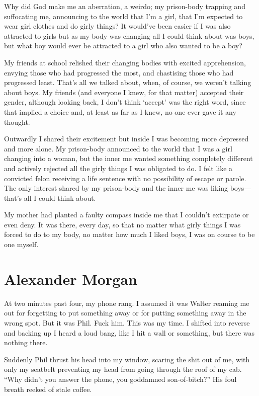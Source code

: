 Why did God make me an aberration, a weirdo; my prison-body trapping and
suffocating me, announcing to the world that I'm a girl, that I'm
expected to wear girl clothes and do girly things? It would've been
easier if I was also attracted to girls but as my body was changing all
I could think about was boys, but what boy would ever be attracted to a
girl who also wanted to be a boy?

My friends at school relished their changing bodies with excited
apprehension, envying those who had progressed the most, and chastising
those who had progressed least. That's all we talked about, when, of
course, we weren't talking about boys. My friends (and everyone I knew,
for that matter) accepted their gender, although looking back, I don't
think `accept' was the right word, since that implied a choice and, at
least as far as I knew, no one ever gave it any thought.

Outwardly I shared their excitement but inside I was becoming more
depressed and more alone. My prison-body announced to the world that I
was a girl changing into a woman, but the inner me wanted something
completely different and actively rejected all the girly things I was
obligated to do. I felt like a convicted felon receiving a life sentence
with no possibility of escape or parole. The only interest shared by my
prison-body and the inner me was liking boys---that's all I could think
about.

My mother had planted a faulty compass inside me that I couldn't
extirpate or even deny. It was there, every day, so that no matter what
girly things I was forced to do to my body, no matter how much I liked
boys, I was on course to be one myself.

\chapter{Alexander Morgan}

\titlemark

At two minutes past four, my phone rang. I assumed it was Walter reaming
me out for forgetting to put something away or for putting something
away in the wrong spot. But it was Phil. Fuck him. This was my time. I
shifted into reverse and backing up I heard a loud bang, like I hit a
wall or something, but there was nothing there.

Suddenly Phil thrust his head into my window, scaring the shit out of
me, with only my seatbelt preventing my head from going through the roof
of my cab. ``Why didn't you answer the phone, you goddamned
son-of-bitch?'' His foul breath reeked of stale coffee.

